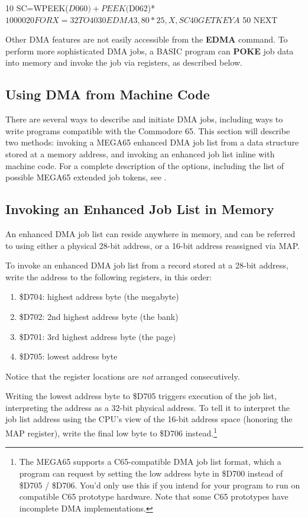 \begin{basiccode}
10 SC=WPEEK($D060)+PEEK($D062)*$10000
20 FOR X=32 TO 40
30 EDMA 3,80*25,X,SC
40 GETKEY A$
50 NEXT
\end{basiccode}

Other DMA features are not easily accessible from the \textbf{EDMA} command. To perform more sophisticated DMA jobs, a BASIC program can \textbf{POKE} job data into memory and invoke the job via registers, as described below.

\subsection{Using DMA from Machine Code}

There are several ways to describe and initiate DMA jobs, including ways to write programs compatible with the Commodore 65. This section will describe two methods: invoking a MEGA65 enhanced DMA job list from a data structure stored at a memory address, and invoking an enhanced job list inline with machine code. For a complete description of the options, including the list of possible MEGA65 extended job tokens, see .

\subsection{Invoking an Enhanced Job List in Memory}

An enhanced DMA job list can reside anywhere in memory, and can be referred to using either a physical 28-bit address, or a 16-bit address reassigned via MAP.

To invoke an enhanced DMA job list from a record stored at a 28-bit address, write the address to the following registers, in this order:

\begin{enumerate}
\item \$D704: highest address byte (the megabyte)
\item \$D702: 2nd highest address byte (the bank)
\item \$D701: 3rd highest address byte (the page)
\item \$D705: lowest address byte
\end{enumerate}

Notice that the register locations are \emph{not} arranged consecutively.

Writing the lowest address byte to \$D705 triggers execution of the job list, interpreting the address as a 32-bit physical address. To tell it to interpret the job list address using the CPU's view of the 16-bit address space (honoring the MAP register), write the final low byte to \$D706 instead.\footnote{The MEGA65 supports a C65-compatible DMA job list format, which a program can request by setting the low address byte in \$D700 instead of \$D705 / \$D706. You'd only use this if you intend for your program to run on compatible C65 prototype hardware. Note that some C65 prototypes have incomplete DMA implementations.}

